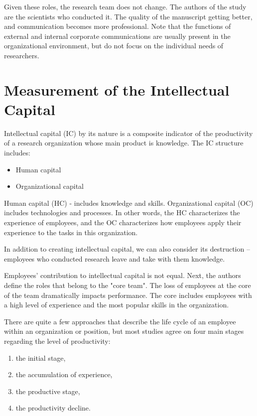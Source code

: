 \documentclass[12pt]{report}
\theoremstyle{definition}
\providecommand{\tightlist}{%
	\setlength{\itemsep}{0pt}\setlength{\parskip}{0pt}}
\begin{document}
Given these roles, the research team does not change.
The authors of the study are the scientists who conducted it. 
The quality of the manuscript getting better, and communication becomes more professional. 
Note that the functions of external and internal corporate communications are usually present in the organizational environment, but do not focus on the individual needs of researchers.

\section{Measurement of the Intellectual Capital}
\label{sec:ic}
Intellectual capital (IC) by its nature is a composite indicator of the productivity of a research organization whose main product is knowledge.
The IC structure includes:
\begin{itemize}
	\tightlist
	\item Human capital 
	\item Organizational capital 
\end{itemize}

Human capital (HC) - includes knowledge and skills. 
Organizational capital (OC) includes technologies and processes. 
In other words, the HC characterizes the experience of employees, and the OC characterizes how employees apply their experience to the tasks in this organization. 

In addition to creating intellectual capital, we can also consider its destruction – employees who conducted research leave and take with them knowledge.

Employees' contribution to intellectual capital is not equal. 
Next, the authors define the roles that belong to the "core team". 
The loss of employees at the core of the team dramatically impacts performance. 
The core includes employees with a high level of experience and the most popular skills in the organization.

There are quite a few approaches that describe the life cycle of an employee within an organization or position, but most studies agree on four main stages regarding the level of productivity:

\begin{enumerate}
	\tightlist
	\item the initial stage, 
	\item the accumulation of experience, 
	\item the productive stage, 
	\item the productivity decline.  
\end{enumerate}
\end{document}
